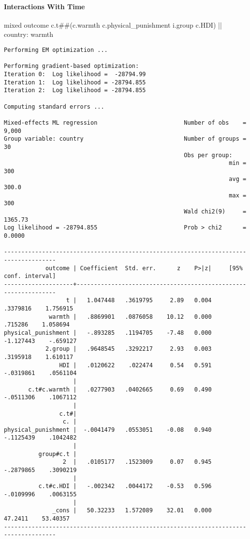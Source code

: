 \documentclass[
  letterpaper,
  DIV=11,
  numbers=noendperiod]{scrreprt}
\let\oldparagraph\paragraph
\renewcommand{\paragraph}[1]{\oldparagraph{#1}\mbox{}}
\newenvironment{Shaded}{\begin{snugshade}}{\end{snugshade}}
\newcommand{\FunctionTok}[1]{\textcolor[rgb]{0.28,0.35,0.67}{#1}}
\newcommand{\NormalTok}[1]{\textcolor[rgb]{0.00,0.23,0.31}{#1}}
\begin{document}
\paragraph{Interactions With Time}\label{interactions-with-time}

\begin{Shaded}
\begin{Highlighting}[]

\NormalTok{mixed outcome c.t\#\#(c.warmth c.physical\_punishment i.}\FunctionTok{group}\NormalTok{ c.HDI) || country: warmth}
\end{Highlighting}
\end{Shaded}

\begin{verbatim}
Performing EM optimization ...

Performing gradient-based optimization: 
Iteration 0:  Log likelihood =  -28794.99  
Iteration 1:  Log likelihood = -28794.855  
Iteration 2:  Log likelihood = -28794.855  

Computing standard errors ...

Mixed-effects ML regression                         Number of obs    =   9,000
Group variable: country                             Number of groups =      30
                                                    Obs per group:
                                                                 min =     300
                                                                 avg =   300.0
                                                                 max =     300
                                                    Wald chi2(9)     = 1365.73
Log likelihood = -28794.855                         Prob > chi2      =  0.0000

-------------------------------------------------------------------------------------
            outcome | Coefficient  Std. err.      z    P>|z|     [95% conf. interval]
--------------------+----------------------------------------------------------------
                  t |   1.047448   .3619795     2.89   0.004     .3379816    1.756915
             warmth |   .8869901   .0876058    10.12   0.000      .715286    1.058694
physical_punishment |   -.893285   .1194705    -7.48   0.000    -1.127443    -.659127
            2.group |   .9648545   .3292217     2.93   0.003     .3195918    1.610117
                HDI |   .0120622    .022474     0.54   0.591    -.0319861    .0561104
                    |
       c.t#c.warmth |   .0277903   .0402665     0.69   0.490    -.0511306    .1067112
                    |
                c.t#|
                 c. |
physical_punishment |  -.0041479   .0553051    -0.08   0.940    -.1125439    .1042482
                    |
          group#c.t |
                 2  |   .0105177   .1523009     0.07   0.945    -.2879865    .3090219
                    |
          c.t#c.HDI |   -.002342   .0044172    -0.53   0.596    -.0109996    .0063155
                    |
              _cons |   50.32233   1.572089    32.01   0.000      47.2411    53.40357
-------------------------------------------------------------------------------------


\end{verbatim}
\end{document}
